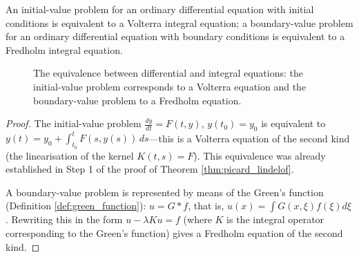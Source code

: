 \begin{proposition}\label{prop:integral_differential_equivalence}
An initial-value problem for an ordinary differential equation with initial conditions is equivalent to a Volterra integral equation; a boundary-value problem for an ordinary differential equation with boundary conditions is equivalent to a Fredholm integral equation.
\end{proposition}

\begin{figure}[htbp]
\centering
{}
\caption{The equivalence between differential and integral equations: the initial-value problem corresponds to a Volterra equation and the boundary-value problem to a Fredholm equation.}
\label{fig:integral_differential_equivalence}
\end{figure}

\begin{proof}
The initial-value problem $\frac{dy}{dt} = F(t,y)$, $y(t_0) = y_0$ is equivalent to $y(t) = y_0 + \int_{t_0}^t F(s, y(s))\,ds$---this is a Volterra equation of the second kind (the linearisation of the kernel $K(t,s) = F$). This equivalence was already established in Step 1 of the proof of Theorem \ref{thm:picard_lindelof}.

A boundary-value problem is represented by means of the Green's function (Definition \ref{def:green_function}): $u = G * f$, that is, $u(x) = \int G(x,\xi)f(\xi)d\xi$. Rewriting this in the form $u - \lambda K u = f$ (where $K$ is the integral operator corresponding to the Green's function) gives a Fredholm equation of the second kind.
\end{proof}

